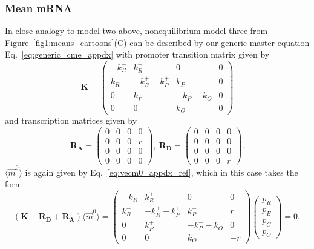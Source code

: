 \subsubsection{Mean mRNA}
In close analogy to model two above, nonequilibrium model three from
Figure~\ref{fig1:means_cartoons}(C) can be described by our generic master
equation Eq.~\ref{eq:generic_cme_appdx} with promoter transition matrix given by
\begin{equation}
\mathbf{K} =
\begin{pmatrix} -k_R^- & k_R^+ & 0 & 0\\
        k_R^- & -k_R^+ -k_P^+ & k_P^- & 0 \\
        0 & k_P^+ & -k_P^- - k_O & 0 \\
        0 & 0 & k_O & 0
\end{pmatrix}
\end{equation}
and transcription matrices given by
\begin{equation}
\mathbf{R_A} =
\begin{pmatrix}
        0 & 0 & 0 & 0 \\ 
        0 & 0 & 0 & r \\ 
        0 & 0 & 0 & 0 \\ 
        0 & 0 & 0 & 0
\end{pmatrix},\
\mathbf{R_D} =
\begin{pmatrix}
        0 & 0 & 0 & 0 \\ 
        0 & 0 & 0 & 0 \\ 
        0 & 0 & 0 & 0 \\ 
        0 & 0 & 0 & r
\end{pmatrix}.
\end{equation}
$\langle\vec{m}^0\rangle$ is again given by Eq.~\ref{eq:vecm0_appdx_ref},
which in this case takes the form
\begin{equation}
(\mathbf{K} - \mathbf{R_D} + \mathbf{R_A}) \langle\vec{m}^0\rangle =
\begin{pmatrix} -k_R^- & k_R^+ & 0 & 0\\
    k_R^- & -k_R^+ -k_P^+ & k_P^- & r \\
    0 & k_P^+ & -k_P^- - k_O & 0 \\
    0 & 0 & k_O & - r
\end{pmatrix}
\begin{pmatrix} p_R \\ p_E \\ p_C \\ p_O
\end{pmatrix} = 0,
\end{equation}
